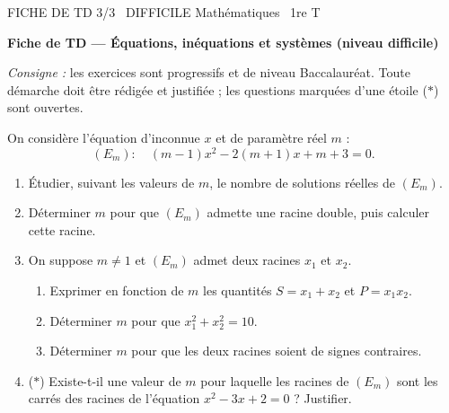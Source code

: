 \documentclass[11pt]{article}
\def\star{\mathbin{\ast}}\def\bigstar{\mathord{\ast}}%
\begin{document}
\begin{tcolorbox}[enhanced,colback=popink,colframe=popink,arc=10pt,boxrule=0pt,left=12pt,right=12pt,top=9pt,bottom=9pt]
{\color{white}\popxbold\small FICHE DE TD 3/3 \textbullet\ DIFFICILE \hfill Mathématiques \textbullet\ 1re T\par}
\end{tcolorbox}
\vspace{4pt}
\textbf{Fiche de TD — Équations, inéquations et systèmes (niveau difficile)}

\emph{Consigne :} les exercices sont progressifs et de niveau Baccalauréat. Toute démarche doit être rédigée et justifiée ; les questions marquées d'une étoile ($\star$) sont ouvertes.

\begin{exercice}
On considère l'équation d'inconnue $x$ et de paramètre réel $m$ :
\[
(E_m):\quad (m-1)x^2 - 2(m+1)x + m + 3 = 0.
\]
\begin{enumerate}
\item Étudier, suivant les valeurs de $m$, le nombre de solutions réelles de $(E_m)$.
\item Déterminer $m$ pour que $(E_m)$ admette une racine double, puis calculer cette racine.
\item On suppose $m \neq 1$ et $(E_m)$ admet deux racines $x_1$ et $x_2$.
\begin{enumerate}
\item Exprimer en fonction de $m$ les quantités $S = x_1 + x_2$ et $P = x_1 x_2$.
\item Déterminer $m$ pour que $x_1^2 + x_2^2 = 10$.
\item Déterminer $m$ pour que les deux racines soient de signes contraires.
\end{enumerate}
\item ($\star$) Existe-t-il une valeur de $m$ pour laquelle les racines de $(E_m)$ sont les carrés des racines de l'équation $x^2 - 3x + 2 = 0$ ? Justifier.
\end{enumerate}
\end{exercice}
\end{document}

